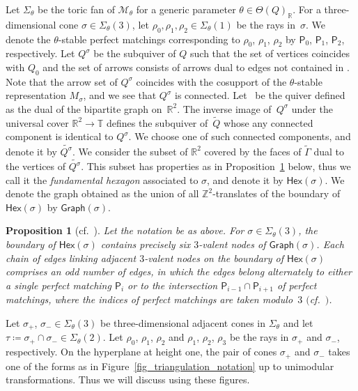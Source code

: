 \documentclass[pdftex]{sigma}
\numberwithin{equation}{section}
\newtheorem{Proposition}[Theorem]{Proposition}
\theoremstyle{definition}
\newcommand{\ZZ}{\mathbb{Z}}
\newcommand{\RR}{\mathbb{R}}
\newcommand{\TT}{\mathbb{T}}
\newcommand{\calM}{\mathcal{M}}
\newcommand{\sfP}{\mathsf{P}}
\newcommand{\Hex}{\mathsf{Hex}}
\newcommand{\Graph}{\mathsf{Graph}}
\begin{document}
Let $\Sigma_\theta$ be the toric fan of $\calM_\theta$ for a generic parameter $\theta\in\Theta(Q)_\RR$.
For a three-dimensional cone $\sigma\in\Sigma_\theta(3)$, let $\rho_0, \rho_1, \rho_2\in\Sigma_\theta(1)$ be the rays in~$\sigma$.
We denote the $\theta$-stable perfect matchings corresponding to $\rho_0$, $\rho_1$, $\rho_2$ by $\sfP_0$, $\sfP_1$, $\sfP_2$, respectively.
Let $Q^\sigma$ be the subquiver of $Q$ such that the set of vertices coincides with $Q_0$ and
the set of arrows consists of arrows dual to edges not contained in \smash{$\bigcup_{0\le i\le 2}\sfP_i$}.
Note that the arrow set of $Q^\sigma$ coincides with the cosupport of the $\theta$-stable representation $M_\sigma$,
and we see that $Q^\sigma$ is connected.
Let~ be the quiver defined as the dual of the bipartite graph \smash{$\widetilde{\Gamma}$} on~$\RR^2$.
The inverse image of~$Q^\sigma$ under the universal cover $\RR^2\rightarrow\TT$ defines the subquiver of~$\widetilde{Q}$
whose any connected component is identical to $Q^\sigma$.
We choose one of such connected components, and denote it by $\widetilde{Q^\sigma}$.
We consider the subset of $\RR^2$ covered by the faces of $\widetilde{\Gamma}$ dual to the vertices of $\widetilde{Q^\sigma}$.
This subset has properties as in Proposition~\ref{prop_hex_property} below,
thus we call it the \emph{fundamental hexagon} associated to $\sigma$, and denote it by $\Hex(\sigma)$.
We denote the graph obtained as the union of all $\ZZ^2$-translates of the boundary of $\Hex(\sigma)$ by $\Graph(\sigma)$.

\begin{Proposition}[{cf.\ \cite[Proposition~3.4 and its proof]{CHT}}]\label{prop_hex_property}
Let the notation be as above.
For $\sigma\in\Sigma_\theta(3)$, the boundary of $\Hex(\sigma)$ contains precisely six $3$-valent nodes of $\Graph(\sigma)$.
Each chain of edges linking adjacent $3$-valent nodes on the boundary of $\Hex(\sigma)$ comprises an odd number of edges, in which
the edges belong alternately to either a single perfect matching $\sfP_i$ or to the intersection $\sfP_{i-1}\cap\sfP_{i+1}$ of perfect matchings,
where the indices of perfect matchings are taken modulo~$3$ $($cf.\ {\rm \cite[\emph{Figure}~4]{CHT}}$)$.
\end{Proposition}

Let $\sigma_+$, $\sigma_-\in\Sigma_\theta(3)$ be three-dimensional adjacent cones in $\Sigma_\theta$ and let $\tau\coloneqq\sigma_+\cap \sigma_-\in\Sigma_\theta(2)$.
Let $\rho_0$, $\rho_1$, $\rho_2$ and $\rho_1$, $\rho_2$, $\rho_3$ be the rays in $\sigma_+$ and $\sigma_-$, respectively.
On the hyperplane at height one, the pair of cones $\sigma_+$ and $\sigma_-$ takes one of the forms as in Figure~\ref{fig_triangulation_notation}
up to unimodular transformations. Thus we will discuss using these figures.
\end{document}
